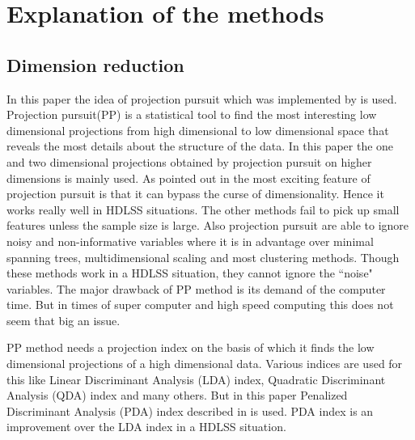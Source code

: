 \documentclass[12]{article}
\begin{document}

\section{Explanation of the methods}

 
\subsection{Dimension reduction}

In this paper the idea of projection pursuit which was implemented by \cite{friedman:1974} is used. Projection pursuit(PP) is a statistical tool to find the most interesting low dimensional projections from high dimensional to low dimensional space that reveals the most details about the structure of the data. In this paper the one and two dimensional projections obtained by projection pursuit on higher dimensions is mainly used.  As pointed out in \cite{huber:1985} the most exciting feature of projection pursuit is that it can bypass the curse of dimensionality. Hence it works really well in HDLSS situations. The other methods fail to pick up small features unless the sample size is large. Also projection pursuit are able to ignore noisy and non-informative variables where it is in advantage over minimal spanning trees, multidimensional scaling and most clustering methods. Though these methods work in a HDLSS situation, they cannot ignore the ``noise" variables. The  major drawback of PP method is its demand of the computer time. But in times of super computer and high speed computing this does not seem that big an issue.

PP method needs a projection index on the basis of which it finds the low dimensional projections of a high dimensional data. Various indices are used for this like Linear Discriminant Analysis (LDA) index, Quadratic Discriminant Analysis (QDA) index and many others. But in this paper Penalized Discriminant Analysis (PDA) index described in \cite{lee:2009} is used. PDA index is an improvement over the LDA index in a HDLSS situation. 
\end{document}
